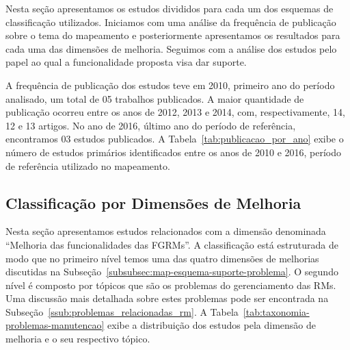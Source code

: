 Nesta seção apresentamos os estudos divididos para cada um dos esquemas de
classificação utilizados. Iniciamos com uma análise da frequência de publicação
sobre o tema do mapeamento e posteriormente apresentamos os resultados para cada
uma das dimensões de melhoria. Seguimos com a análise dos estudos pelo papel ao
qual a funcionalidade proposta visa dar suporte.

A frequência de publicação dos estudos teve em 2010, primeiro ano do período
analisado, um total de 05 trabalhos publicados. A maior quantidade de
publicação ocorreu entre os anos de 2012, 2013 e 2014, com, respectivamente,
14, 12 e 13 artigos. No ano de 2016, último ano do período de referência,
encontramos 03 estudos publicados. A Tabela~\ref{tab:publicacao_por_ano} exibe
o número de estudos primários identificados entre os anos de 2010 e 2016,
período de referência utilizado no mapeamento.

\begin{table}[htpb]
\centering
{}
\caption{Número de estudos primários por ano de publicação.}
\label{tab:publicacao_por_ano}
\end{table}

\subsection{Classificação por Dimensões de Melhoria}
\label{sub:extensões_para_problemas_na_manutenção_de_software}

Nesta seção apresentamos estudos relacionados com a dimensão denominada
``Melhoria das funcionalidades das FGRMs\@''. A classificação está estruturada
de modo que no primeiro nível temos uma das quatro dimensões de melhorias
discutidas na Subseção~\ref{subsubsec:map-esquema-suporte-problema}. O segundo
nível é composto por tópicos que são os problemas do gerenciamento das RMs. Uma
discussão mais detalhada sobre estes problemas pode ser encontrada na
Subseção~\ref{ssub:problemas_relacionadas_rm}. A
Tabela~\ref{tab:taxonomia-problemas-manutencao} exibe a distribuição dos
estudos pela dimensão de melhoria e o seu respectivo tópico.

